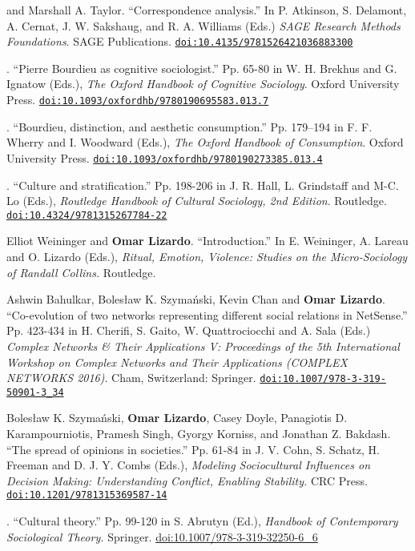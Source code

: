 
 and Marshall A. Taylor. ``Correspondence analysis.'' In P. Atkinson, S. Delamont, A. Cernat, J. W. Sakshaug, and R. A. Williams (Eds.) {\em SAGE Research Methods Foundations}. SAGE Publications. \href{ http://dx.doi.org/10.4135/9781526421036883300 }{\nolinkurl{doi:10.4135/9781526421036883300}}

. ``Pierre Bourdieu as cognitive sociologist.'' Pp. 65-80 in W. H. Brekhus and G. Ignatow (Eds.), {\em The Oxford Handbook of Cognitive Sociology}. Oxford University Press. \href{https://doi.org/10.1093/oxfordhb/9780190695583.013.7
}{\nolinkurl{doi:10.1093/oxfordhb/9780190695583.013.7}}

. ``Bourdieu, distinction, and aesthetic consumption.'' Pp.  179–194 in F. F. Wherry and I. Woodward (Eds.), {\em The Oxford Handbook of Consumption}. Oxford University Press. \href{ http://dx.doi.org/10.1093/oxfordhb/9780190273385.013.4}{\nolinkurl{doi:10.1093/oxfordhb/9780190273385.013.4}}

. ``Culture and stratification.'' Pp. 198-206 in J. R. Hall, L. Grindstaff and M-C. Lo (Eds.), {\em Routledge Handbook of Cultural Sociology, 2nd Edition}. Routledge. \href{http://dx.doi.org/10.4324/9781315267784-22 }{\nolinkurl{doi:10.4324/9781315267784-22}}

\ind Elliot Weininger and {\bf Omar Lizardo}. ``Introduction.'' In E. Weininger, A. Lareau and O. Lizardo (Eds.), {\em Ritual, Emotion, Violence: Studies on the Micro-Sociology of Randall Collins.} Routledge. 

\ind Ashwin Bahulkar, Boles\l{}aw K. Szyma\'{n}ski, Kevin Chan and {\bf Omar Lizardo}. ``Co-evolution of two networks representing different social relations in NetSense.'' Pp. 423-434 in H. Cherifi, S. Gaito, W. Quattrociocchi and A. Sala (Eds.)  {\em Complex Networks \& Their Applications V: Proceedings of the 5th International Workshop on Complex Networks and Their Applications (COMPLEX NETWORKS 2016)}. Cham, Switzerland: Springer. \href{https://doi.org/10.1007/978-3-319-50901-3_34}{\nolinkurl{doi:10.1007/978-3-319-50901-3_34}}


\ind Boles\l{}aw K. Szyma\'{n}ski, {\bf Omar Lizardo}, Casey Doyle, Panagiotis D. Karampourniotis, Pramesh Singh, Gyorgy Korniss, and Jonathan Z. Bakdash. ``The spread of opinions in societies.'' Pp. 61-84 in J. V. Cohn, S. Schatz, H. Freeman and D. J. Y. Combs (Eds.), {\em Modeling Sociocultural Influences on Decision Making: Understanding Conflict, Enabling Stability.} CRC Press. \href{http://dx.doi.org/
10.1201/9781315369587-14}{\nolinkurl{doi:10.1201/9781315369587-14}}

. ``Cultural theory.'' Pp. 99-120 in S. Abrutyn (Ed.), {\em Handbook of Contemporary Sociological Theory.} Springer. \newline\href{https://doi.org/10.1007/978-3-319-32250-6_6}{doi:10.1007/978-3-319-32250-6\_6}